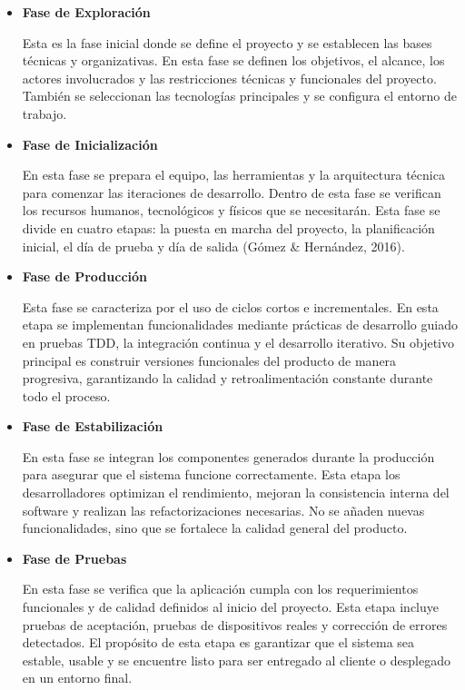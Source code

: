 \begin{itemize}
    \item \textbf{Fase de Exploración}

    Esta es la fase inicial donde se define el proyecto y se establecen las
    bases técnicas y organizativas. En esta fase se definen los objetivos, el
    alcance, los actores involucrados y las restricciones técnicas y
    funcionales del proyecto. También se seleccionan las tecnologías
    principales y se configura el entorno de trabajo.

    \item \textbf{Fase de Inicialización}

    En esta fase se prepara el equipo, las herramientas y la arquitectura
    técnica para comenzar las iteraciones de desarrollo. Dentro de esta fase se
    verifican los recursos humanos, tecnológicos y físicos que se necesitarán.
    Esta fase se divide en cuatro etapas: la puesta en marcha del proyecto, la
    planificación inicial, el día de prueba y día de salida (Gómez \&
    Hernández, 2016).

    \item \textbf{Fase de Producción}

    Esta fase se caracteriza por el uso de ciclos cortos e incrementales. En
    esta etapa se implementan funcionalidades mediante prácticas de desarrollo
    guiado en pruebas TDD, la integración continua y el desarrollo iterativo.
    Su objetivo principal es construir versiones funcionales del producto de
    manera progresiva, garantizando la calidad y retroalimentación constante
    durante todo el proceso.

    \item \textbf{Fase de Estabilización}

    En esta fase se integran los componentes generados durante la producción
    para asegurar que el sistema funcione correctamente. Esta etapa los
    desarrolladores optimizan el rendimiento, mejoran la consistencia interna
    del software y realizan las refactorizaciones necesarias. No se añaden
    nuevas funcionalidades, sino que se fortalece la calidad general del
    producto.

    \item \textbf{Fase de Pruebas}

    En esta fase se verifica que la aplicación cumpla con los requerimientos
    funcionales y de calidad definidos al inicio del proyecto. Esta etapa
    incluye pruebas de aceptación, pruebas de dispositivos reales y corrección
    de errores detectados. El propósito de esta etapa es garantizar que el
    sistema sea estable, usable y se encuentre listo para ser entregado al
    cliente o desplegado en un entorno final.
\end{itemize}

